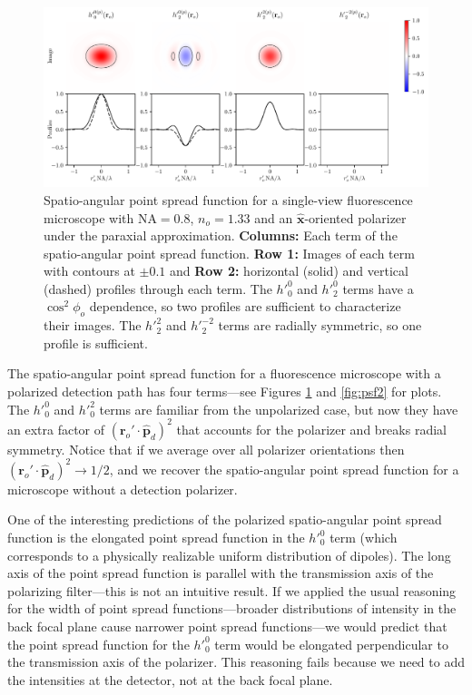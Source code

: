 \documentclass[11pt]{article}
\providecommand{\ro}[1]{\mathbf{\mathbf{r}}_o}
\providecommand{\mh}[1]{\mathbf{\hat{#1}}}
\begin{document}
\begin{figure}[ht]
 \captionsetup{width=1.0\linewidth}
 \centering
   \centering
   \includegraphics[width = 1.\textwidth]{../calculations/psfs0.pdf}
   \caption{Spatio-angular point spread function for a single-view fluorescence
     microscope with $\text{NA}=0.8$, $n_o=1.33$ and an $\mh{x}$-oriented
     polarizer under the paraxial approximation. \textbf{Columns:} Each term of
     the spatio-angular point spread function. \textbf{Row 1:} Images of each
     term with contours at $\pm 0.1$ and \textbf{Row 2:} horizontal (solid) and
     vertical (dashed) profiles through each term. The ${h'}_0^0$ and ${h'}_2^0$
     terms have a $\cos^2\phi_o$ dependence, so two profiles are sufficient to
     characterize their images. The ${h'}_2^2$ and ${h'}_2^{-2}$ terms are
     radially symmetric, so one profile is sufficient.}
   \label{fig:psf}
\end{figure}

The spatio-angular point spread function for a fluorescence microscope with a
polarized detection path has four terms---see Figures \ref{fig:psf} and \ref{fig:psf2} for plots.
The ${h'}_0^0$ and ${h'}_0^2$ terms are familiar from the unpolarized case, but
now they have an extra factor of $(\ro{}'\cdot\mh{p}_d)^2$ that accounts for the
polarizer and breaks radial symmetry. Notice that if we average over all
polarizer orientations then $(\ro{}'\cdot\mh{p}_d)^2 \rightarrow 1/2$, and we
recover the spatio-angular point spread function for a microscope without a
detection polarizer.

One of the interesting predictions of the polarized spatio-angular point spread
function is the elongated point spread function in the ${h'}_0^0$ term (which
corresponds to a physically realizable uniform distribution of dipoles). The
long axis of the point spread function is parallel with the transmission axis of
the polarizing filter---this is not an intuitive result. If we applied the usual
reasoning for the width of point spread functions---broader distributions of
intensity in the back focal plane cause narrower point spread functions---we
would predict that the point spread function for the ${h'}_0^0$ term would be
elongated perpendicular to the transmission axis of the polarizer. This
reasoning fails because we need to add the intensities at the detector, not at
the back focal plane.
\end{document}
